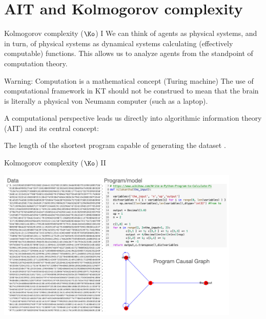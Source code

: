 \section{AIT and Kolmogorov complexity}
\begin{frame}[label=intro3]{Kolmogorov complexity ($\Ko$) I}
 We can think of agents as physical systems, and in turn,  of physical systems as dynamical systems calculating (effectively computable) functions.   This allows us to analyze agents from the standpoint of computation theory.
 \begin{alertblock}{Warning: Computation is a mathematical concept (Turing machine)}
The use of computational framework  in KT should not be construed to mean that the brain is literally a physical von Neumann computer (such as a laptop).
\end{alertblock}\vfill 
 
A computational perspective  leads us directly into algorithmic information theory (AIT) and its central concept: 


\begin{definition}
The length of the shortest program capable of generating  the dataset \citep{Kolomgorov1965,Cover:2006aa}.  
\end{definition} \vfill

\end{frame}


\begin{frame}[label=intro3]{Kolmogorov complexity ($\Ko$) II}
 \begin{center}%
  \includegraphics[height=7.2cm]{img/pi.png}
  \end{center}
\end{frame}

